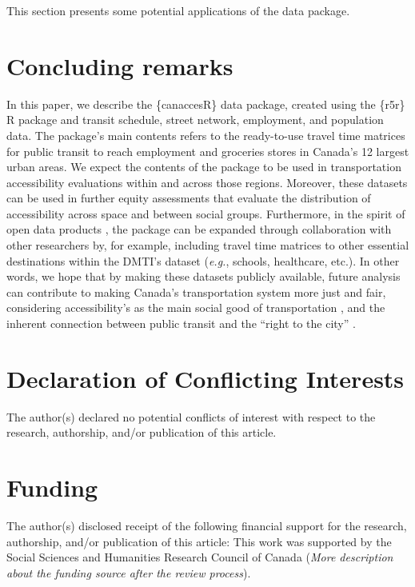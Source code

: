 \documentclass[Royal,times,sageh]{sagej}
\begin{document}
This section presents some potential applications of the data package.

\section{Concluding remarks}\label{concluding-remarks}

In this paper, we describe the \{canaccesR\} data package, created using
the \{r5r\} R package and transit schedule, street network, employment,
and population data. The package's main contents refers to the
ready-to-use travel time matrices for public transit to reach employment
and groceries stores in Canada's 12 largest urban areas. We expect the
contents of the package to be used in transportation accessibility
evaluations within and across those regions. Moreover, these datasets
can be used in further equity assessments that evaluate the distribution
of accessibility across space and between social groups. Furthermore, in
the spirit of open data products
\citep{arribas-belOpenDataProductsA2021}, the package can be expanded
through collaboration with other researchers by, for example, including
travel time matrices to other essential destinations within the DMTI's
dataset (\emph{e.g.}, schools, healthcare, etc.). In other words, we
hope that by making these datasets publicly available, future analysis
can contribute to making Canada's transportation system more just and
fair, considering accessibility's as the main social good of
transportation \citep{martensTransportJusticeDesigning2016}, and the
inherent connection between public transit and the ``right to the city''
\citep{cogginRightTransportMoving2015}.

\section{Declaration of Conflicting
Interests}\label{declaration-of-conflicting-interests}

The author(s) declared no potential conflicts of interest with respect
to the research, authorship, and/or publication of this article.

\section{Funding}\label{funding}

The author(s) disclosed receipt of the following financial support for
the research, authorship, and/or publication of this article: This work
was supported by the Social Sciences and Humanities Research Council of
Canada (\emph{More description about the funding source after the review
process}).
\end{document}
